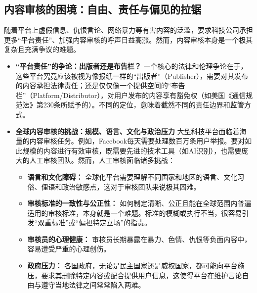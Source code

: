 \documentclass[UTF8, 10pt]{ctexbook}
\begin{document}
\subsection{内容审核的困境：自由、责任与偏见的拉锯}
随着平台上虚假信息、仇恨言论、网络暴力等有害内容的泛滥，要求科技公司承担更多“平台责任”、加强内容审核的呼声日益高涨。然而，内容审核本身是一个极其复杂且充满争议的难题。
\begin{itemize}
    \item \textbf{“平台责任”的争论：出版者还是布告栏？}
    一个核心的法律和伦理争论在于，这些平台究竟应该被视为像报纸一样的“出版者”（Publisher），需要对其发布的内容承担法律责任；还是仅仅像一个提供空间的“布告栏”（Platform/Distributor），对用户发布的内容享有豁免权（如美国《通信规范法》第230条所赋予的）。不同的定位，意味着截然不同的责任边界和监管方式。

    \item \textbf{全球内容审核的挑战：规模、语言、文化与政治压力}
    大型科技平台面临着海量的内容审核任务。例如，Facebook每天需要处理数百万条用户举报。要对如此规模的内容进行有效审核，既需要先进的技术工具（如AI识别），也需要庞大的人工审核团队。然而，人工审核面临诸多挑战：
    \begin{itemize}
        \item \textbf{语言和文化障碍：} 全球化平台需要理解不同国家和地区的语言、文化习俗、俚语和政治敏感点，这对于审核团队来说极其困难。
        \item \textbf{审核标准的一致性与公正性：} 如何制定清晰、公正且能在全球范围内普遍适用的审核标准，本身就是一个难题。标准的模糊或执行不当，很容易引发“双重标准”或“偏袒特定立场”的指责。
        \item \textbf{审核员的心理健康：} 审核员长期暴露在暴力、色情、仇恨等负面内容中，容易遭受严重的心理创伤。
        \item \textbf{政府压力：} 各国政府，无论是民主国家还是威权国家，都可能向平台施压，要求其删除特定内容或配合提供用户信息，这使得平台在维护言论自由与遵守当地法律之间常常陷入两难。
    \end{itemize}
\end{itemize}
\end{document}
